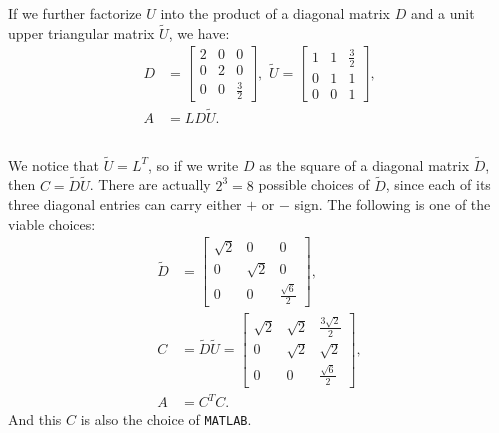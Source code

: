 \documentclass[11pt]{article}
\begin{document}
If we further factorize $U$ into the product of a diagonal matrix $D$ and a unit upper triangular matrix $\tilde U$, we have:
\begin{equation}\begin{split} 
D &= \begin{bmatrix} 2 & 0 & 0 \\ 0 & 2 & 0 \\ 0 & 0 & \frac32\end{bmatrix}, \,\, 
\tilde U = \begin{bmatrix} 1 & 1 & \frac32\\ 0 & 1 & 1 \\ 0 & 0 & 1\end{bmatrix},\\
A &= L D \tilde U.  
\end{split}\nonumber\end{equation} 
\subsection{}
We notice that $\tilde U = L^T$, so if we write $D$ as the square of a diagonal matrix $\tilde D$, then $C = \tilde D \tilde U$. There are actually $2^3=8$ possible choices of $\tilde D$, since each of its three diagonal entries can carry either $+$ or $-$ sign. The following is one of the viable choices:
\begin{equation}\begin{split}
\tilde D &= \begin{bmatrix} \sqrt{2} & 0 & 0 \\ 0 & \sqrt{2} & 0 \\ 0 & 0 & \frac{\sqrt{6}}2 \end{bmatrix},\\
C &= \tilde D \tilde U = \begin{bmatrix}\sqrt{2} & \sqrt{2} & \frac{3\sqrt{2}}2 \\ 0 & \sqrt{2} & \sqrt{2} \\ 0 & 0 & \frac{\sqrt{6}}2  \end{bmatrix},\\
A &= C^TC.
\end{split}\nonumber\end{equation} 
And this $C$ is also the choice of \texttt{MATLAB}.
\end{document}
